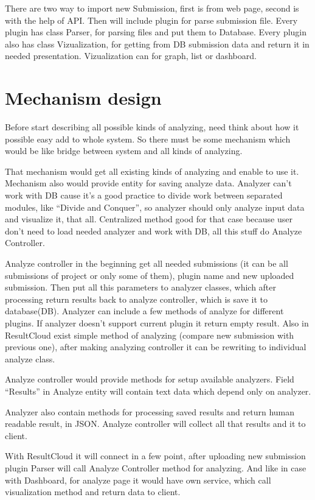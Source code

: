 There are two way to import  new Submission, first is from web page, second is with the help of API. Then will include plugin for parse submission file. Every plugin has class Parser, for parsing files and put them to Database. Every plugin also has class Vizualization, for getting from DB submission data and return it in needed presentation. Vizualization can for graph, list or dashboard.  

\chapter{Mechanism design}

Before start describing all possible kinds of analyzing, need think about how it possible easy add to whole system. So there must be some mechanism which would be like bridge between system and all kinds of analyzing.

That mechanism would get all existing kinds of analyzing and enable to use it. Mechanism also would provide entity for saving analyze data. Analyzer can't work with DB cause it's a good practice to divide work between separated modules, like “Divide and Conquer”, so analyzer should only analyze input data and visualize it, that all. Centralized method good for that case because user don't need to load needed analyzer and work with DB, all this stuff do Analyze Controller.

Analyze controller in the beginning get all needed submissions (it can be all submissions of project or only some of them), plugin name and new uploaded submission. Then put all this parameters to analyzer classes, which after processing return results back to analyze controller, which is save it to database(DB). Analyzer can include a few methods of analyze for different plugins. If analyzer doesn't support current plugin it return empty result. Also in ResultCloud exist simple method of analyzing (compare new submission with previous one), after making analyzing controller it can be rewriting to individual analyze class.

Analyze controller would provide methods for setup available analyzers. Field “Results” in Analyze entity will contain text data which depend only on analyzer. 

Analyzer also contain methods for processing saved results and return human readable result, in JSON. Analyze controller will collect all that results and it to client. 

With ResultCloud it will connect in a few point, after uploading new submission plugin Parser will call Analyze Controller method for analyzing. And like in case with Dashboard, for analyze page it would have own service, which call visualization method and return data to client.

